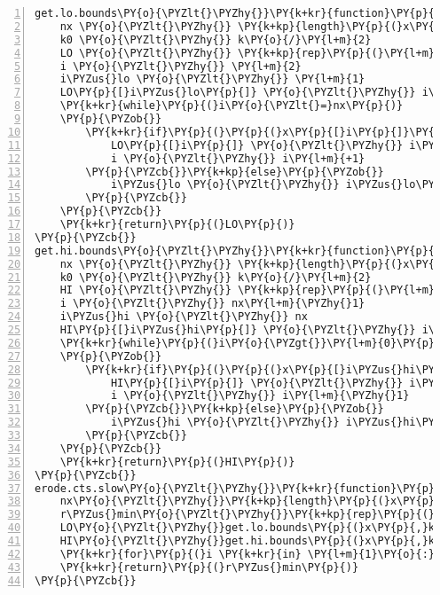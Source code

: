 \begin{Verbatim}[commandchars=\\\{\},codes={\catcode`\$=3\catcode`\^=7\catcode`\_=8},gobble=0,numbers=left,fontfamily=fvm,fontshape=n,fontsize=\footnotesize,tabsize=2]
get.lo.bounds\PY{o}{\PYZlt{}\PYZhy{}}\PY{k+kr}{function}\PY{p}{(}x\PY{p}{,}k\PY{p}{)}\PY{p}{\PYZob{}}
	nx \PY{o}{\PYZlt{}\PYZhy{}} \PY{k+kp}{length}\PY{p}{(}x\PY{p}{)}
	k0 \PY{o}{\PYZlt{}\PYZhy{}} k\PY{o}{/}\PY{l+m}{2}
	LO \PY{o}{\PYZlt{}\PYZhy{}} \PY{k+kp}{rep}\PY{p}{(}\PY{l+m}{0}\PY{p}{,}nx\PY{p}{)}
	i \PY{o}{\PYZlt{}\PYZhy{}} \PY{l+m}{2}
	i\PYZus{}lo \PY{o}{\PYZlt{}\PYZhy{}} \PY{l+m}{1}
	LO\PY{p}{[}i\PYZus{}lo\PY{p}{]} \PY{o}{\PYZlt{}\PYZhy{}} i\PYZus{}lo \PY{c+c1}{\PYZsh{} x[1] has lower bound 1}
	\PY{k+kr}{while}\PY{p}{(}i\PY{o}{\PYZlt{}=}nx\PY{p}{)}
	\PY{p}{\PYZob{}}
		\PY{k+kr}{if}\PY{p}{(}\PY{p}{(}x\PY{p}{[}i\PY{p}{]}\PY{o}{\PYZhy{}}x\PY{p}{[}i\PYZus{}lo\PY{p}{]}\PY{p}{)}\PY{o}{\PYZlt{}=}k0\PY{p}{)}\PY{p}{\PYZob{}}
			LO\PY{p}{[}i\PY{p}{]} \PY{o}{\PYZlt{}\PYZhy{}} i\PYZus{}lo
			i \PY{o}{\PYZlt{}\PYZhy{}} i\PY{l+m}{+1}
		\PY{p}{\PYZcb{}}\PY{k+kp}{else}\PY{p}{\PYZob{}}
			i\PYZus{}lo \PY{o}{\PYZlt{}\PYZhy{}} i\PYZus{}lo\PY{l+m}{+1} 
		\PY{p}{\PYZcb{}}
	\PY{p}{\PYZcb{}}
	\PY{k+kr}{return}\PY{p}{(}LO\PY{p}{)}
\PY{p}{\PYZcb{}}
get.hi.bounds\PY{o}{\PYZlt{}\PYZhy{}}\PY{k+kr}{function}\PY{p}{(}x\PY{p}{,}k\PY{p}{)}\PY{p}{\PYZob{}}
	nx \PY{o}{\PYZlt{}\PYZhy{}} \PY{k+kp}{length}\PY{p}{(}x\PY{p}{)}
	k0 \PY{o}{\PYZlt{}\PYZhy{}} k\PY{o}{/}\PY{l+m}{2}
	HI \PY{o}{\PYZlt{}\PYZhy{}} \PY{k+kp}{rep}\PY{p}{(}\PY{l+m}{0}\PY{p}{,}nx\PY{p}{)}
	i \PY{o}{\PYZlt{}\PYZhy{}} nx\PY{l+m}{\PYZhy{}1}
	i\PYZus{}hi \PY{o}{\PYZlt{}\PYZhy{}} nx
	HI\PY{p}{[}i\PYZus{}hi\PY{p}{]} \PY{o}{\PYZlt{}\PYZhy{}} i\PYZus{}hi \PY{c+c1}{\PYZsh{} x[nx] has upper bound nx}
	\PY{k+kr}{while}\PY{p}{(}i\PY{o}{\PYZgt{}}\PY{l+m}{0}\PY{p}{)}
	\PY{p}{\PYZob{}}
		\PY{k+kr}{if}\PY{p}{(}\PY{p}{(}x\PY{p}{[}i\PYZus{}hi\PY{p}{]}\PY{o}{\PYZhy{}}x\PY{p}{[}i\PY{p}{]}\PY{p}{)}\PY{o}{\PYZlt{}=}k0\PY{p}{)}\PY{p}{\PYZob{}}
			HI\PY{p}{[}i\PY{p}{]} \PY{o}{\PYZlt{}\PYZhy{}} i\PYZus{}hi
			i \PY{o}{\PYZlt{}\PYZhy{}} i\PY{l+m}{\PYZhy{}1}
		\PY{p}{\PYZcb{}}\PY{k+kp}{else}\PY{p}{\PYZob{}}
			i\PYZus{}hi \PY{o}{\PYZlt{}\PYZhy{}} i\PYZus{}hi\PY{l+m}{\PYZhy{}1} 
		\PY{p}{\PYZcb{}}
	\PY{p}{\PYZcb{}}
	\PY{k+kr}{return}\PY{p}{(}HI\PY{p}{)}
\PY{p}{\PYZcb{}}
erode.cts.slow\PY{o}{\PYZlt{}\PYZhy{}}\PY{k+kr}{function}\PY{p}{(}x\PY{p}{,}f\PY{p}{,}k\PY{p}{)}\PY{p}{\PYZob{}}
	nx\PY{o}{\PYZlt{}\PYZhy{}}\PY{k+kp}{length}\PY{p}{(}x\PY{p}{)}
	r\PYZus{}min\PY{o}{\PYZlt{}\PYZhy{}}\PY{k+kp}{rep}\PY{p}{(}\PY{l+m}{0}\PY{p}{,}nx\PY{p}{)}
	LO\PY{o}{\PYZlt{}\PYZhy{}}get.lo.bounds\PY{p}{(}x\PY{p}{,}k\PY{p}{)}
	HI\PY{o}{\PYZlt{}\PYZhy{}}get.hi.bounds\PY{p}{(}x\PY{p}{,}k\PY{p}{)}
	\PY{k+kr}{for}\PY{p}{(}i \PY{k+kr}{in} \PY{l+m}{1}\PY{o}{:}nx\PY{p}{)} r\PYZus{}min\PY{p}{[}i\PY{p}{]}\PY{o}{\PYZlt{}\PYZhy{}}\PY{k+kp}{min}\PY{p}{(}f\PY{p}{[}LO\PY{p}{[}i\PY{p}{]}\PY{o}{:}HI\PY{p}{[}i\PY{p}{]]}\PY{p}{)}
	\PY{k+kr}{return}\PY{p}{(}r\PYZus{}min\PY{p}{)}
\PY{p}{\PYZcb{}}
\end{Verbatim}

